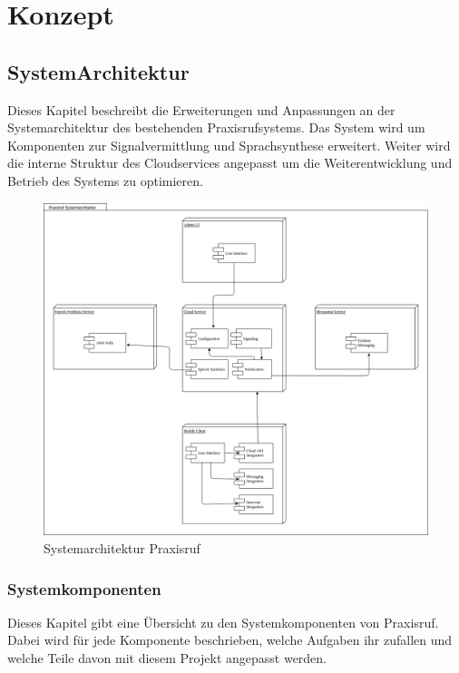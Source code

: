 \section{Konzept}

\subsection{SystemArchitektur}

Dieses Kapitel beschreibt die Erweiterungen und Anpassungen an der Systemarchitektur des bestehenden Praxisrufsystems.
Das System wird um Komponenten zur Signalvermittlung und Sprachsynthese erweitert.
Weiter wird die interne Struktur des Cloudservices angepasst um die Weiterentwicklung und Betrieb des Systems zu optimieren.

\begin{figure}[h]
    \centering
    \begin{minipage}[b]{0.75\textwidth}
        \includegraphics[width=\textwidth]{graphics/diagramms/Component_System_V02}
        \caption{Systemarchitektur Praxisruf}
    \end{minipage}
\end{figure}

\subsubsection{Systemkomponenten}

Dieses Kapitel gibt eine Übersicht zu den Systemkomponenten von Praxisruf.
Dabei wird für jede Komponente beschrieben, welche Aufgaben ihr zufallen und welche Teile davon mit diesem Projekt angepasst werden.

